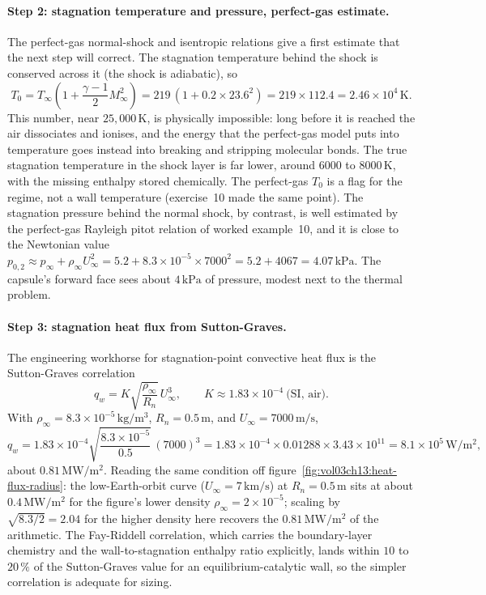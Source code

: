 \paragraph{Step 2: stagnation temperature and pressure, perfect-gas
estimate.} The perfect-gas normal-shock and isentropic relations give a
first estimate that the next step will correct. The stagnation
temperature behind the shock is conserved across it (the shock is
adiabatic), so
\[
T_0 = T_\infty\!\left(1 + \frac{\gamma - 1}{2}M_\infty^2\right)
= 219\,(1 + 0.2\times 23.6^2) = 219\times 112.4 = 2.46\times 10^4\,
\si{\kelvin}.
\]
This number, near $25{,}000\,\si{\kelvin}$, is physically impossible:
long before it is reached the air dissociates and ionises, and the
energy that the perfect-gas model puts into temperature goes instead
into breaking and stripping molecular bonds. The true stagnation
temperature in the shock layer is far lower, around $6000$ to
$8000\,\si{\kelvin}$, with the missing enthalpy stored chemically. The
perfect-gas $T_0$ is a flag for the regime, not a wall temperature
(exercise~10 made the same point). The stagnation pressure behind the
normal shock, by contrast, is well estimated by the perfect-gas
Rayleigh pitot relation of worked example~10, and it is close to the
Newtonian value $p_{0,2} \approx p_\infty + \rho_\infty U_\infty^2 =
5.2 + 8.3\times 10^{-5}\times 7000^2 = 5.2 + 4067 = 4.07\,\text{kPa}$.
The capsule's forward face sees about $4\,\text{kPa}$ of pressure, modest
next to the thermal problem.

\paragraph{Step 3: stagnation heat flux from Sutton-Graves.} The
engineering workhorse for stagnation-point convective heat flux is the
Sutton-Graves correlation
\[
q_w = K\sqrt{\frac{\rho_\infty}{R_n}}\,U_\infty^3,
\qquad K \approx 1.83\times 10^{-4}\ \text{(SI, air)}.
\]
With $\rho_\infty = 8.3\times 10^{-5}\,\si{\kilogram\per\meter\cubed}$,
$R_n = 0.5\,\si{\meter}$, and $U_\infty = 7000\,\si{\meter\per
\second}$,
\[
q_w = 1.83\times 10^{-4}\sqrt{\frac{8.3\times 10^{-5}}{0.5}}\,
(7000)^3
= 1.83\times 10^{-4}\times 0.01288\times 3.43\times 10^{11}
= 8.1\times 10^{5}\,\si{\watt\per\meter\squared},
\]
about $0.81\,\si{\mega\watt\per\meter\squared}$. Reading the same
condition off figure~\ref{fig:vol03ch13:heat-flux-radius}: the
low-Earth-orbit curve ($U_\infty = 7\,\si{\kilo\meter\per\second}$) at
$R_n = 0.5\,\si{\meter}$ sits at about $0.4\,\si{\mega\watt\per
\meter\squared}$ for the figure's lower density
$\rho_\infty = 2\times 10^{-5}$; scaling by
$\sqrt{8.3/2} = 2.04$ for the higher density here recovers the
$0.81\,\si{\mega\watt\per\meter\squared}$ of the arithmetic. The
Fay-Riddell correlation, which carries the boundary-layer chemistry and
the wall-to-stagnation enthalpy ratio explicitly, lands within
$10$ to $20\,\%$ of the Sutton-Graves value for an equilibrium-catalytic
wall, so the simpler correlation is adequate for sizing.

